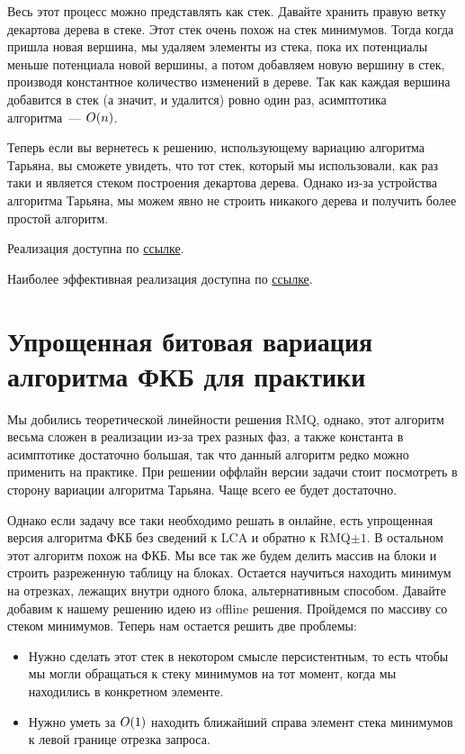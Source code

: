 Весь этот процесс можно представлять как стек. Давайте хранить правую ветку декартова дерева в стеке. Этот стек очень похож на стек минимумов. Тогда когда пришла новая вершина, мы удаляем элементы из стека, пока их потенциалы меньше потенциала новой вершины, а потом добавляем новую вершину в стек, производя константное количество изменений в дереве. Так как каждая вершина добавится в стек (а значит, и удалится) ровно один раз, асимптотика алгоритма~--- $O(n)$.

\begin{observation}
    Теперь если вы вернетесь к решению, использующему вариацию алгоритма Тарьяна, вы сможете увидеть, что тот стек, который мы использовали, как раз таки и является стеком построения декартова дерева. Однако из-за устройства алгоритма Тарьяна, мы можем явно не строить никакого дерева и получить более простой алгоритм.
\end{observation}

Реализация доступна по \href{https://pastebin.com/Q17qR0Ja}{ссылке}.

Наиболее эффективная реализация доступна по \href{https://pastebin.com/T6H9x36M}{ссылке}.

\section{Упрощенная битовая вариация алгоритма ФКБ для практики}

Мы добились теоретической линейности решения RMQ, однако, этот алгоритм весьма сложен в реализации из-за трех разных фаз, а также константа в асимптотике достаточно большая, так что данный алгоритм редко можно применить на практике. При решении оффлайн версии задачи стоит посмотреть в сторону вариации алгоритма Тарьяна. Чаще всего ее будет достаточно.

Однако если задачу все таки необходимо решать в онлайне, есть упрощенная версия алгоритма ФКБ без сведений к LCA и обратно к RMQ$\pm 1$. В остальном этот алгоритм похож на ФКБ. Мы все так же будем делить массив на блоки и строить разреженную таблицу на блоках. Остается научиться находить минимум на отрезках, лежащих внутри одного блока, альтернативным способом. Давайте добавим к нашему решению идею из offline решения. Пройдемся по массиву со стеком минимумов. Теперь нам остается решить две проблемы:

\begin{itemize}
    \item Нужно сделать этот стек в некотором смысле персистентным, то есть чтобы мы могли обращаться к стеку минимумов на тот момент, когда мы находились в конкретном элементе.
    \item Нужно уметь за $O(1)$ находить ближайший справа элемент стека минимумов к левой границе отрезка запроса.
\end{itemize}

